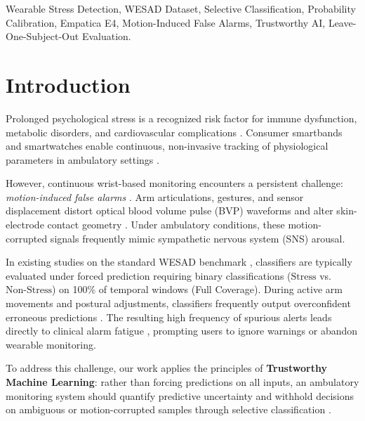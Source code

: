 \documentclass[conference]{IEEEtran}
\begin{document}
\begin{IEEEkeywords}
Wearable Stress Detection, WESAD Dataset, Selective Classification, Probability Calibration, Empatica E4, Motion-Induced False Alarms, Trustworthy AI, Leave-One-Subject-Out Evaluation.
\end{IEEEkeywords}

\section{Introduction}
Prolonged psychological stress is a recognized risk factor for immune dysfunction, metabolic disorders, and cardiovascular complications \cite{cohen2007psychological, schneiderman2005stress, can2019stress}. Consumer smartbands and smartwatches enable continuous, non-invasive tracking of physiological parameters in ambulatory settings \cite{gjoreski2016continuous, schmidt2018wesad, sano2015recognizing}.

However, continuous wrist-based monitoring encounters a persistent challenge: \textit{motion-induced false alarms} \cite{schumm2008effect, tamura2014wearable, zhang2014troika}. Arm articulations, gestures, and sensor displacement distort optical blood volume pulse (BVP) waveforms and alter skin-electrode contact geometry \cite{boucsein2012electrodermal}. Under ambulatory conditions, these motion-corrupted signals frequently mimic sympathetic nervous system (SNS) arousal.

In existing studies on the standard WESAD benchmark \cite{schmidt2018wesad, siirtola2019continuous, bobade2020stress, dalmeida2021hrv, behinaein2021transformer, castaldo2015acute}, classifiers are typically evaluated under forced prediction requiring binary classifications ($\text{Stress}$ vs. $\text{Non-Stress}$) on 100\% of temporal windows (Full Coverage). During active arm movements and postural adjustments, classifiers frequently output overconfident erroneous predictions \cite{guo2017calibration}. The resulting high frequency of spurious alerts leads directly to clinical alarm fatigue \cite{sendelbach2013alarm}, prompting users to ignore warnings or abandon wearable monitoring.

To address this challenge, our work applies the principles of \textbf{Trustworthy Machine Learning}: rather than forcing predictions on all inputs, an ambulatory monitoring system should quantify predictive uncertainty and withhold decisions on ambiguous or motion-corrupted samples through selective classification \cite{chow1970optimum, cortes2016learning, geifman2017selective, geifman2019selectivenet, grandvalet2008support, hendrickx2024machine}.
\end{document}
